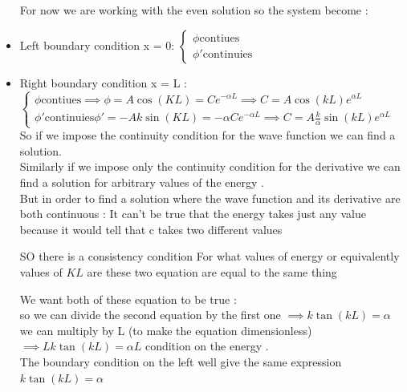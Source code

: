 \documentclass[12pt,oneside]{book}
\begin{document}
\begin{itemize}
		For now we are working with the even solution so the system become : 
		\item Left boundary condition x = 0: 
		$\begin{cases}
			\phi \text{contiues} \\
			\phi' \text{continuies}
		\end{cases}$
		\item Right boundary condition x = L : 
		$\begin{cases}
			\phi \text{contiues} \implies \phi = A \cos(KL) = C e^{-\alpha L} \implies C = A\cos(kL)e^{\alpha L}\\
			\phi' \text{continuies} \phi' = -Ak\sin(KL) = - \alpha Ce^{-\alpha L} \implies C = A \frac{k}{\alpha}\sin(kL)e^{\alpha L}
		\end{cases}$
		So if we impose the continuity condition for the wave function we can find a solution.\\
		Similarly if we impose only the continuity condition for the derivative we can find a solution for arbitrary values of the energy . \\
		But in order to find a solution where the wave function and its derivative are both continuous :
		It can't be true that the energy takes just any value because it would tell that c takes two different values  
		\begin{center}
			SO there is a consistency condition For what values of energy or equivalently values of $KL$ are these two equation are equal to the same thing
		\end{center}
		We want both of these equation to be true : \\
		so we can divide the second equation by the first one $\implies    k\tan(kL) = \alpha$ we can multiply by L (to make the equation dimensionless)$\implies Lk\tan(kL) = \alpha L$ condition on the energy .\\

		The boundary condition on the left well give the same expression $ k\tan(kL) = \alpha$


\end{itemize}
\end{document}
